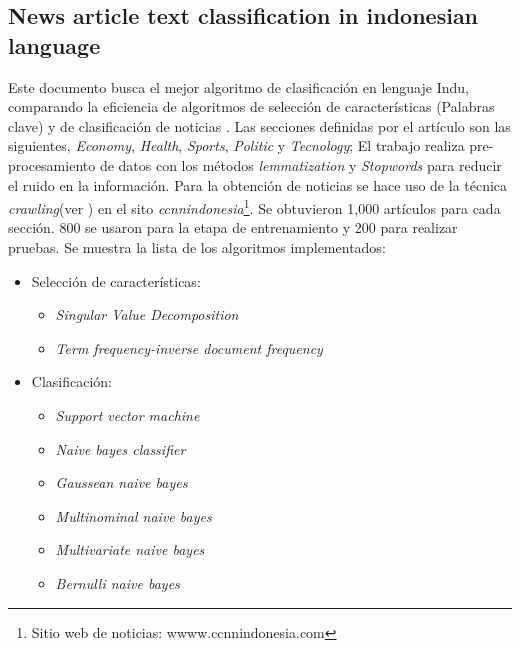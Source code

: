 
\begin{large}
	 \subsection{News article text classification in indonesian language}
\end{large}

Este documento busca el mejor algoritmo de clasificación en lenguaje Indu, comparando la eficiencia de algoritmos de selección de características (Palabras clave) y de clasificación de noticias \citep{CD8}. Las secciones definidas por el artículo son las siguientes, \textit{Economy}, \textit{Health}, \textit{Sports}, \textit{Politic} y \textit{Tecnology}; El trabajo realiza pre-procesamiento de datos con  los métodos \textit{lemmatization} y \textit{Stopwords} para reducir el ruido en la información. Para la obtención de noticias se hace uso de la técnica \textit{crawling}(ver ) en el sito \textit{ccnnindonesia}\footnote{Sitio web de noticias: wwww.ccnnindonesia.com}. Se obtuvieron 1,000 artículos para cada sección. 800 se usaron para la etapa de entrenamiento y 200 para realizar pruebas. Se muestra la lista de los algoritmos implementados:

\begin{itemize}
	\item Selección de características:
	\begin{itemize}
		\item \textit{Singular Value Decomposition}
		\item \textit{Term frequency-inverse document frequency}
	\end{itemize}

	\item Clasificación:
	\begin{itemize}
		\item \textit{Support vector machine}
		\item \textit{Naive bayes classifier}
		\item \textit{Gaussean naive bayes}
		\item \textit{Multinominal naive bayes}
		\item \textit{Multivariate naive bayes}
		\item \textit{Bernulli naive bayes}
	\end{itemize}
\end{itemize}

